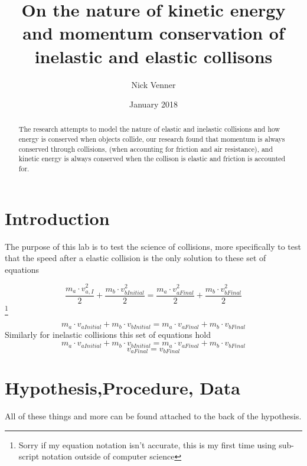 \documentclass{article}
\title{On the nature of kinetic energy and momentum conservation of inelastic and elastic collisons}
\author{Nick Venner}
\date{January 2018}
\begin{document}
\maketitle
{}
\begin{abstract}
    The research attempts to model the nature of elastic and inelastic collisions and how energy is conserved when objects collide, our research found that momentum is always conserved through collisions, (when accounting for friction and air resistance), and kinetic energy is always conserved when the collison is elastic and friction is accounted for.
\end{abstract}
\section*{Introduction}
The purpose of this lab is to test the science of collisions, more specifically to test that the speed after a elastic collision is the only solution to these set of equations

\begin{equation}
    {\frac{m_a\cdot v_{a,I
    }^2}{2}+\frac{m_b\cdot v_{b Initial}^2}{2}=\frac{m_a\cdot v_{a Final}^2}{2}+\frac{m_b\cdot v_{b Final}^2}{2}}
    \end{equation}\footnote{Sorry if my equation notation isn't accurate, this is my first time using sub-script notation outside of computer science}

\begin{equation}
    m_a\cdot v_{aInitial}+m_b\cdot v_{b Initial}=m_a\cdot v_{a Final}+m_b\cdot v_{b Final}
\end{equation}
Similarly for inelastic collisions this set of equations hold
\begin{equation}
    m_a\cdot v_{aInitial}+m_b\cdot v_{b Initial}=m_a\cdot v_{a Final}+m_b\cdot v_{b Final}\tag{2}
\end{equation}
\begin{equation}
    v_{a Final}=v_{b Final}
\end{equation}
\section*{Hypothesis,Procedure, Data}
All of these things and more can be found attached to the back of the hypothesis.
\end{document}
